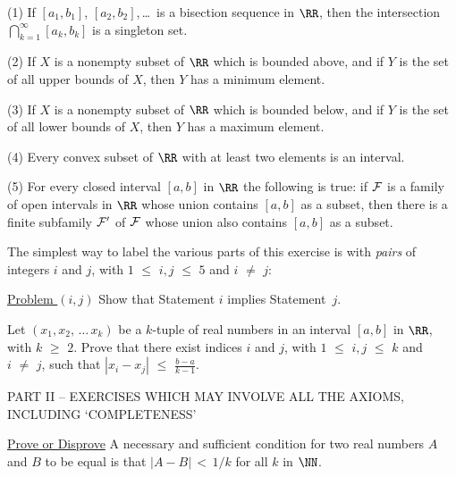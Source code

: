 \V

        (1) If $[a_{1},b_{1}]$, $[a_{2},b_{2}]$,\,{\ldots}\, is a bisection sequence in ${\RR}$,
    then the intersection ${\bigcap}_{k=1}^{{\infty}} [a_{k},b_{k}]$ is a singleton set.

\V

        (2) If $X$ is a nonempty subset of ${\RR}$ which is bounded above, and if $Y$ is the set of all upper bounds of $X$, then $Y$ has a minimum element.

\V

        (3) If $X$ is a nonempty subset of ${\RR}$ which is bounded below, and if $Y$ is the set of all lower bounds of $X$, then $Y$ has a maximum element.

\V

        (4) Every convex subset of ${\RR}$ with at least two elements is an interval.

\V

        (5) For every closed interval $[a,b]$ in ${\RR}$ the following is true: 
    if ${\cal F}$ is a family of open intervals in ${\RR}$ whose union contains $[a,b]$ as a subset,
    then there is a finite subfamily ${\cal F}'$ of ${\cal F}$ whose union also contains $[a,b]$ as a subset.

\V

        The simplest way to label the various parts of this exercise is with {\em pairs} of integers $i$ and $j$, with $1\,\,{\leq}\,\,i,j\,\,{\leq}\,\,5$ and $i \,\,{\neq}\,\, j$:

        \underline{Problem $(i,j)$} Show that Statement $i$ implies Statement~$j$.


\V
\V

\noindent \ExBad Let $(x_{1},x_{2},\,{\ldots}\,x_{k})$ be a $k$-tuple of real numbers in an interval $[a,b]$ in ${\RR}$, with $k\,\,{\geq}\,\,2$.
    Prove that there exist indices $i$ and $j$, with $1\,\,{\leq}\,\,i,j\,\,{\leq}\,\,k$ and $i \,\,{\neq}\,\, j$,
    such that ${\displaystyle |x_{i}-x_{j}|\,\,{\leq}\,\,\frac{b-a}{k-1}}$.

\V
\V
\V

\newpage

\begin{center}
PART II -- EXERCISES WHICH MAY INVOLVE ALL THE AXIOMS, INCLUDING `COMPLETENESS'
\end{center}

\V
\V
\V
\V


\noindent \ExBae \underline{Prove or Disprove} A necessary and sufficient condition for two real numbers $A$ and $B$ to be equal is that $|A-B|\,<\,1/k$ for all $k$ in ${\NN}$.

